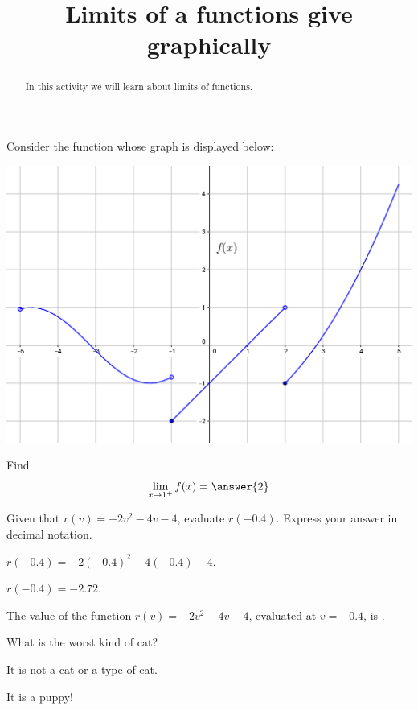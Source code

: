 \documentclass{ximera}
\title{Limits of a functions give graphically}
\begin{document}
\begin{abstract}
In this activity we will learn about limits of functions.
\end{abstract}
\maketitle

Consider the function whose graph is displayed below:
\bigskip
\begin{image}
\includegraphics{pieceWise1.png}
\end{image}

\begin{exercise}
Find 
\[\lim_{x \to 1^+} f(x)=\answer{2}\]
\end{exercise}


\begin{exercise}
Given that $r(v)=-2 v^2-4 v-4$, evaluate $r(-0.4)$. Express your answer in decimal notation.
\begin{hint}
$r(-0.4)=-2 (-0.4)^2-4 (-0.4)-4$.
\end{hint}
\begin{hint}
$r(-0.4)=-2.72$.
\end{hint}

The value of the function $r(v)=-2 v^2-4 v-4$, evaluated at $v=-0.4$, is .
\end{exercise}



\begin{question}
What is the worst kind of cat?
\begin{prompt}
\begin{multipleChoice}
\end{multipleChoice}
\end{prompt}
\begin{hint}
It is not a cat or a type of cat.
\end{hint}
\begin{hint}
It is a puppy!
\end{hint}
\end{question}
\end{document}
